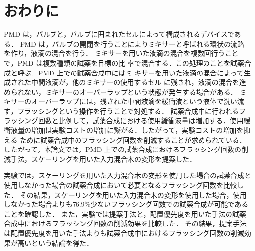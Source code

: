 \chapter{おわりに}
PMD は，バルブと，バルブに囲まれたセルによって構成されるデバイスである．
PMD は，バルブの開閉を行うことによりミキサーと呼ばれる環状の流路を作り，液滴の混合を行う．
ミキサーを用いた液滴の混合を複数回行うことで，PMD は複数種類の試薬を目標の比
率で混合する．この処理のことを試薬合成と呼ぶ．PMD 上での試薬合成中にはミ
キサーを用いた液滴の混合によって生成された中間液滴が，他のミキサーの使用するセル
に残され，液滴の混合を進められない，ミキサーのオーバーラップという状態が発生する場合がある．
ミキサーのオーバーラップには，残された中間液滴を緩衝液という液体で洗い流す，フラッシングという操作を行うことで対処する．
試薬合成中に行われるフラッシング回数と比例して，試薬合成における使用緩衝液量は増加する．使用緩衝液量の増加は実験コストの増加に繋がる．したがって，実験コストの増加を抑える
ために試薬合成中のフラッシング回数を削減することが求められている．
したがって，本論文では，PMD 上での試薬合成におけるフラッシング回数の削減手法，スケーリングを用いた入力混合木の変形を提案した．

実験では，スケーリングを用いた入力混合木の変形を使用した場合の試薬合成と使用しなかった場合の試薬合成において必要となるフラッシング回数を比較した．
その結果，スケーリングを用いた入力混合木の変形を使用した場合，使用しなかった場合よりも76.9\%少ないフラッシング回数での試薬合成が可能であることを確認した．
また，実験では提案手法と，配置優先度を用いた手法の試薬合成中におけるフラッシング回数の削減効果を比較した．
その結果，提案手法は配置優先度を用いた手法よりも試薬合成中におけるフラッシング回数の削減効果が高いという結論を得た．

